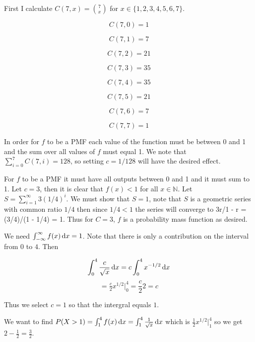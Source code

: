 \documentclass[11pt,largemargins]{homework}
\newcommand{\N}{\mathbb{N}}
\begin{document}
\maketitle
\question 
First I calculate $C(7,x) = \binom{7}{x}$ for $x \in \{1,2,3,4,5,6,7\}$.

\[C(7,0) = 1 \]

\[C(7,1) = 7\]

\[C(7,2) = 21\]

\[C(7,3) = 35\]

\[C(7, 4) = 35\]

\[C(7,5) = 21\]

\[C(7,6) = 7\]

\[C(7,7) =1\]

In order for $f$ to be a PMF each value of the function must be between 0 and 1 and the sum over 
all values of $f$ must equal 1. We note that $\sum_{i = 0}^7 C(7,i) = 128$, so setting $c = 1/128$ will have the desired effect.



\newpage 

\question
For $f$ to be a PMF it must have all outputs between 0 and 1 and it must sum to 1. Let $c = 3$, then it is clear that 
$f(x) < 1$ for all $x \in \N$. Let $S = \sum_{i = 1}^\infty 3(1/4)^i$. We must show that $S = 1$, note that 
$S$ is a geometric series with common ratio $1/4$ then since $1/4 < 1$ the series will converge to 3r/1 - r = (3/4)/(1 - 1/4) = 1. 
Thus for $C = 3$, $f$ is a probability mass function as desired.

\newpage

\question
\begin{alphaparts}
    \questionpart 
    We need $\int_{-\infty}^{\infty} f(x) \dif x= 1$. Note that there is only a contribution on the interval from $0$ to $4$. Then 

    \[ \int_{0}^{4} \frac{c}{\sqrt{x}} \dif x = c \int_{0}^{4} x^{-1/2} \dif x \]
    \[ = \tfrac{c}{2} x^{1/2} \Big|_0^4 = \frac{c}{2}2 = c \]

    Thus we select $c = 1$ so that the intergral equals $1$. 

    \questionpart 
    We want to find $P(X > 1) = \int_{1}^4 f(x) \dif x = \int_{1}^4 \frac{1}{\sqrt{x}} \dif x$ which is 
    $ \tfrac{1}{2} x^{1/2} \Big|_1^4$ so we get $ 2 - \tfrac{1}{2} = \frac{3}{2}$. 
\end{alphaparts}
\end{document}
